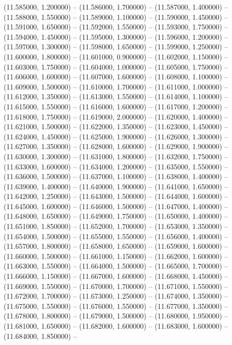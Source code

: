 (11.585000, 1.200000) -- 
(11.586000, 1.700000) -- 
(11.587000, 1.400000) -- 
(11.588000, 1.550000) -- 
(11.589000, 1.100000) -- 
(11.590000, 1.450000) -- 
(11.591000, 1.650000) -- 
(11.592000, 1.550000) -- 
(11.593000, 1.750000) -- 
(11.594000, 1.450000) -- 
(11.595000, 1.300000) -- 
(11.596000, 1.200000) -- 
(11.597000, 1.300000) -- 
(11.598000, 1.650000) -- 
(11.599000, 1.250000) -- 
(11.600000, 1.800000) -- 
(11.601000, 0.900000) -- 
(11.602000, 1.150000) -- 
(11.603000, 1.750000) -- 
(11.604000, 1.000000) -- 
(11.605000, 1.750000) -- 
(11.606000, 1.600000) -- 
(11.607000, 1.600000) -- 
(11.608000, 1.100000) -- 
(11.609000, 1.500000) -- 
(11.610000, 1.700000) -- 
(11.611000, 1.000000) -- 
(11.612000, 1.350000) -- 
(11.613000, 1.550000) -- 
(11.614000, 1.100000) -- 
(11.615000, 1.550000) -- 
(11.616000, 1.600000) -- 
(11.617000, 1.200000) -- 
(11.618000, 1.750000) -- 
(11.619000, 2.000000) -- 
(11.620000, 1.400000) -- 
(11.621000, 1.500000) -- 
(11.622000, 1.350000) -- 
(11.623000, 1.450000) -- 
(11.624000, 1.450000) -- 
(11.625000, 1.900000) -- 
(11.626000, 1.300000) -- 
(11.627000, 1.350000) -- 
(11.628000, 1.600000) -- 
(11.629000, 1.900000) -- 
(11.630000, 1.300000) -- 
(11.631000, 1.800000) -- 
(11.632000, 1.750000) -- 
(11.633000, 1.600000) -- 
(11.634000, 1.200000) -- 
(11.635000, 1.550000) -- 
(11.636000, 1.500000) -- 
(11.637000, 1.100000) -- 
(11.638000, 1.400000) -- 
(11.639000, 1.400000) -- 
(11.640000, 1.900000) -- 
(11.641000, 1.650000) -- 
(11.642000, 1.250000) -- 
(11.643000, 1.500000) -- 
(11.644000, 1.600000) -- 
(11.645000, 1.600000) -- 
(11.646000, 1.500000) -- 
(11.647000, 1.400000) -- 
(11.648000, 1.650000) -- 
(11.649000, 1.750000) -- 
(11.650000, 1.400000) -- 
(11.651000, 1.850000) -- 
(11.652000, 1.700000) -- 
(11.653000, 1.350000) -- 
(11.654000, 1.500000) -- 
(11.655000, 1.550000) -- 
(11.656000, 1.400000) -- 
(11.657000, 1.800000) -- 
(11.658000, 1.650000) -- 
(11.659000, 1.600000) -- 
(11.660000, 1.500000) -- 
(11.661000, 1.150000) -- 
(11.662000, 1.600000) -- 
(11.663000, 1.550000) -- 
(11.664000, 1.500000) -- 
(11.665000, 1.700000) -- 
(11.666000, 1.150000) -- 
(11.667000, 1.600000) -- 
(11.668000, 1.450000) -- 
(11.669000, 1.550000) -- 
(11.670000, 1.700000) -- 
(11.671000, 1.550000) -- 
(11.672000, 1.700000) -- 
(11.673000, 1.250000) -- 
(11.674000, 1.350000) -- 
(11.675000, 1.550000) -- 
(11.676000, 1.550000) -- 
(11.677000, 1.350000) -- 
(11.678000, 1.800000) -- 
(11.679000, 1.500000) -- 
(11.680000, 1.950000) -- 
(11.681000, 1.650000) -- 
(11.682000, 1.600000) -- 
(11.683000, 1.600000) -- 
(11.684000, 1.850000) -- 
